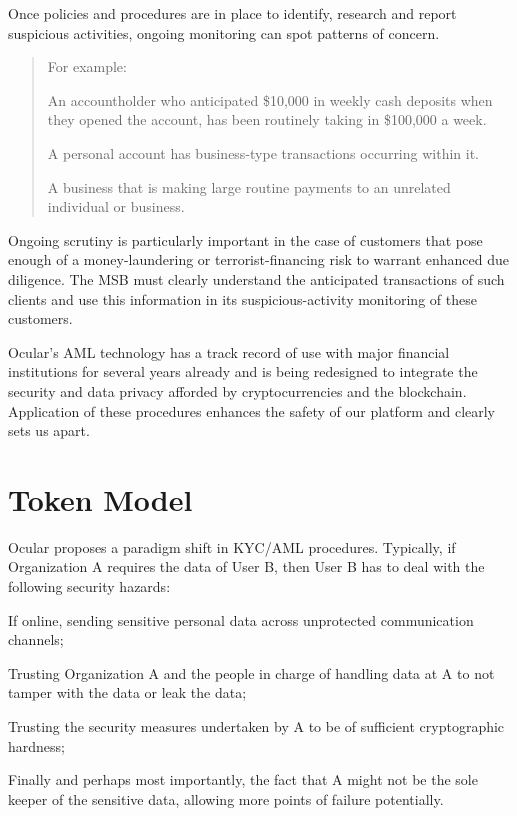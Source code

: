 \documentclass[12pt]{article}
\let\tempone\itemize
\let\temptwo\enditemize
\renewenvironment{itemize}{\tempone\addtolength{\itemsep}{-5pt}}{\temptwo}
\begin{document}
Once policies and procedures are in place to identify, research and report suspicious activities, ongoing monitoring can spot patterns of concern. 
\begin{quotation}For example:
\begin{itemize}
  \item An accountholder who anticipated \$10,000 in weekly cash deposits when they opened the account, has been routinely taking in \$100,000 a week.
  \item A personal account has business-type transactions occurring within it.
  \item A business that is making large routine payments to an unrelated individual or business.
\end{itemize}
\end{quotation}

Ongoing scrutiny is particularly important in the case of customers that pose enough of a money-laundering or terrorist-financing risk to warrant enhanced due diligence. The MSB must clearly understand the anticipated transactions of such clients and use this information in its suspicious-activity monitoring of these customers.

Ocular's AML technology has a track record of use with major financial institutions for several years already and is being redesigned to integrate the security and data privacy afforded by cryptocurrencies and the blockchain. Application of these procedures enhances the safety of our platform and clearly sets us apart.
\newpage

\section{Token Model}

Ocular proposes a paradigm shift in KYC/AML procedures. Typically, if Organization A requires the data of User B, then User B has to deal with the following security hazards:
\begin{itemize}
\item If online, sending sensitive personal data across unprotected communication channels;
\item Trusting Organization A and the people in charge of handling data at A to not tamper with the data or leak the data;
\item Trusting the security measures undertaken by A to be of sufficient cryptographic hardness; 
\item Finally and perhaps most importantly, the fact that A might not be the sole keeper of the sensitive data, allowing more points of failure potentially. 
\end{itemize}
\end{document}

